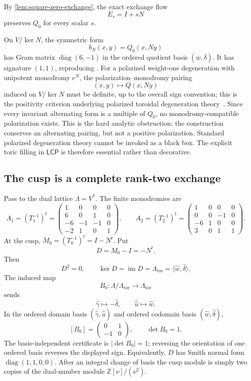 \documentclass[11pt,reqno]{amsart}
\numberwithin{equation}{section}
\newcommand{\Z}{\mathbb Z}
\newcommand{\im}{\operatorname{im}}
\newcommand{\wideg}{\widehat\gamma}
\newcommand{\wideu}{\widehat u}
\newcommand{\widew}{\widehat w}
\newcommand{\wided}{\widehat\delta}
\newcommand{\LambdaTor}{\Lambda_{\mathrm{tor}}}
\newcommand{\LCP}{\mathsf{LCP}}
\theoremstyle{definition}
\begin{document}
By \cref{lem:square-zero-exchange}, the exact exchange flow
\[
E_s=I+sN
\]
preserves $Q_0$ for every scalar $s$.

On $V/\ker N$, the symmetric form
\[
 b_N(x,y)=Q_0(x,Ny)
\]
has Gram matrix $\operatorname{diag}(6,-1)$ in the ordered quotient basis $(\overline w,\overline\delta)$. It has signature $(1,1)$, reproducing \cite[Lem.~2.8, Rems.~2.9 and~3.23]{S6}. For a polarized weight-one degeneration with unipotent monodromy $e^N$, the polarization--monodromy pairing
\[
(x,y)\longmapsto Q(x,Ny)
\]
induced on $V/\ker N$ must be definite, up to the overall sign convention; this is the positivity criterion underlying polarized toroidal degeneration theory~\cite{Clemens,Mumford}. Since every invariant alternating form is a multiple of $Q_0$, no monodromy-compatible polarization exists. This is the hard analytic obstruction: the construction conserves an alternating pairing, but not a positive polarization. Standard polarized degeneration theory cannot be invoked as a black box. The explicit toric filling in $\LCP$ is therefore essential rather than decorative.

\subsection{The cusp is a complete rank-two exchange}

Pass to the dual lattice $\Lambda=V^*$. The finite monodromies are
\begin{equation}\label{eq:A1A2}
A_1=(T_1^{-1})^t=
\begin{pmatrix}
1&0&0&0\\
6&0&1&0\\
-6&-1&-1&0\\
-2&1&0&1
\end{pmatrix},
\qquad
A_2=(T_2^{-1})^t=
\begin{pmatrix}
1&0&0&0\\
0&0&-1&0\\
-6&1&0&0\\
3&0&1&1
\end{pmatrix}.
\end{equation}
At the cusp, $M_0=(T_0^{-1})^t=I-N^t$. Put
\[
D=M_0-I=-N^t.
\]
Then
\[
D^2=0,
\qquad
\ker D=\im D=\LambdaTor=\langle\widew,\wided\rangle.
\]
The induced map
\[
B_0:\Lambda/\LambdaTor\longrightarrow\LambdaTor
\]
sends
\[
\overline{\wideg}\longmapsto-\wided,
\qquad
\overline{\wideu}\longmapsto\widew.
\]
In the ordered domain basis $(\overline{\wideg},\overline{\wideu})$ and ordered codomain basis $(\widew,\wided)$,
\begin{equation}\label{eq:B0}
[B_0]=
\begin{pmatrix}
0&1\\
-1&0
\end{pmatrix},
\qquad
\det B_0=1.
\end{equation}
The basis-independent certificate is $|\det B_0|=1$; reversing the orientation of one ordered basis reverses the displayed sign. Equivalently, $D$ has Smith normal form $\operatorname{diag}(1,1,0,0)$. After an integral change of basis the cusp module is simply two copies of the dual-number module $\Z[\nu]/(\nu^2)$.
\end{document}
